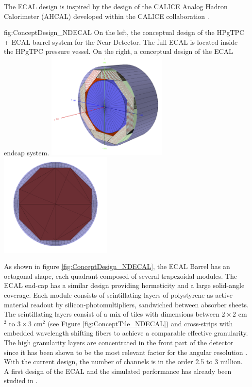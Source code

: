 The ECAL design is inspired by the design of the CALICE Analog Hadron Calorimeter (AHCAL) \cite{collaboration:2010hb} developed within the CALICE collaboration \cite{CALICEwebsite}.
\begin{dunefigure}{fig:ConceptDesign_NDECAL}
{On the left, the conceptual design of the HPgTPC + ECAL barrel system for the Near Detector. The full ECAL is located inside the HPgTPC pressure vessel. On the right, a conceptual design of the ECAL endcap system.}
\includegraphics[width=0.45\textwidth]{graphics/ConceptECALND.png}
\includegraphics[width=0.42\textwidth]{graphics/ECAL_Endcap_System.png}
\end{dunefigure}
As shown in figure \ref{fig:ConceptDesign_NDECAL}, the ECAL Barrel has an octagonal shape, each quadrant composed of several trapezoidal modules. The ECAL end-cap has a similar design providing hermeticity and a large solid-angle coverage. Each module consists of scintillating layers of polystyrene as active material readout by silicon-photomultipliers, sandwiched between absorber sheets. The scintillating layers consist of a mix of tiles with dimensions between $2\times2$ cm$^2$ to $3\times3$ cm$^2$ (see Figure \ref{fig:ConceptTile_NDECAL}) and cross-strips with embedded wavelength shifting fibers to achieve a comparable effective granularity. The high granularity layers are concentrated in the front part of the detector since it has been shown to be the most relevant factor for the angular resolution \cite{Emberger:2018pgr}. With the current design, the number of channels is in the order 2.5 to 3 million. A first design of the ECAL and the simulated performance has already been studied in \cite{Emberger:2018pgr}.

